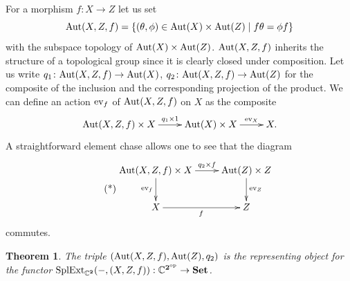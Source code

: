 \documentclass{article}
\newcommand{\C}{\mathbb{C}}
\newcommand{\Aut}{\textnormal{Aut}}
\newcommand{\Set}{\mathbf{Set}}
\newcommand{\op}{\textnormal{op}}
\newcommand{\SplExt}{\textnormal{SplExt}}
\newcommand{\ev}{\textnormal{ev}}
\newcommand{\two}{\mathbf{2}}
\newtheorem{theorem}{Theorem}[section]
\begin{document}
For a morphism $f:X\to Z$ let us set \[\Aut(X,Z,f)=\{(\theta,\phi)\in \Aut(X)\times \Aut(Z)\mid f\theta = \phi f\}\]
with the subspace topology of $\Aut(X)\times \Aut(Z)$. $\Aut(X,Z,f)$ inherits the structure of a topological group since it
is clearly closed under composition. Let us write $q_1\colon \Aut(X,Z,f)\to \Aut(X)$, $q_2 \colon\Aut(X,Z,f)\to \Aut(Z)$ for the composite of the inclusion and
the corresponding projection of the product. We can define an action $\ev_{f}$ of $\Aut(X,Z,f)$ on $X$ as the composite
\[
\xymatrix{
\Aut(X,Z,f)\times X \ar[r]^-{q_1\times 1} & \Aut(X)\times X \ar[r]^-{\ev_X} & X.
}
\]
A straightforward element chase allows one to see that the diagram
\begin{equation}
\tag{*}
\vcenter{
\xymatrix{
\Aut(X,Z,f)\times X
\ar[d]_-{\ev_f}
\ar[r]^-{q_2\times f}
&
\Aut(Z)\times Z
\ar[d]^{\ev_Z}
\\
X
\ar[r]_{f}
&
Z
}
}
\end{equation}
commutes.
\begin{theorem}
The triple $(\Aut(X,Z,f),\Aut(Z),q_2)$ is the representing object for the functor $\SplExt_{\C^\two}(-,(X,Z,f)) : \C^{\two^{\op}}\to \Set$.
\end{theorem}
\end{document}
